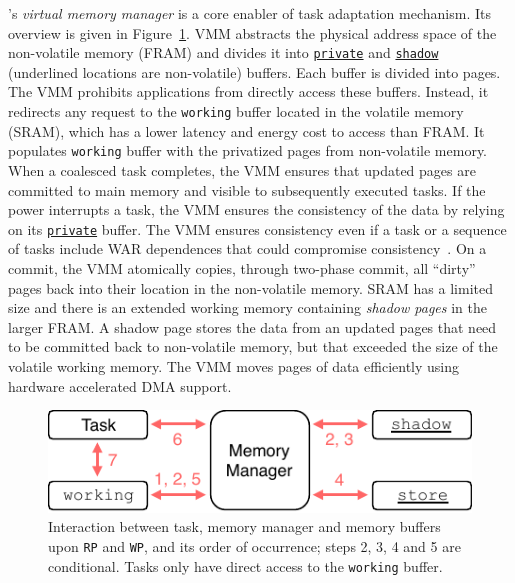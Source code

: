 
\sys's {\em virtual memory manager} is a core enabler of \sys task adaptation mechanism. Its overview is given in Figure~\ref{figure:mem-man}. VMM abstracts the physical address space of the non-volatile memory (FRAM) and divides it into \texttt{\underline{private}} and \texttt{\underline{shadow}} (underlined locations are non-volatile) buffers. Each buffer is divided into pages. The VMM prohibits applications from directly access these buffers. Instead, it redirects any request to the \texttt{working} buffer located in the volatile memory (SRAM), which has a lower latency and energy cost to access than FRAM. It populates \texttt{working} buffer with the privatized pages from non-volatile memory. When a coalesced task completes, the VMM ensures that updated pages are committed to main memory and visible to subsequently executed tasks. If the power interrupts a task, the VMM ensures the consistency of the data by relying on its \texttt{\underline{private}} buffer. The VMM ensures consistency even if a task or a sequence of tasks include WAR dependences that could compromise consistency~\cite{ratchet,dino}. On a commit, the VMM atomically copies, through two-phase commit, all ``dirty'' pages back into their location in the non-volatile memory. SRAM has a limited size and there is an extended working memory containing {\em shadow pages} in the larger FRAM. A shadow page stores the data from an updated pages that need to be committed back to non-volatile memory, but that exceeded the size of the volatile working memory. The VMM moves pages of data efficiently using hardware accelerated DMA support.

\begin{figure}
    \centering
    \includegraphics[width=\columnwidth]{figures/mem-man.pdf}
    \caption{Interaction between task, memory manager and memory buffers upon \texttt{RP} and \texttt{WP}, and its order of occurrence; steps 2, 3, 4 and 5 are conditional. Tasks only have direct access to the \texttt{working} buffer.}
    \label{figure:mem-man}
\end{figure}

